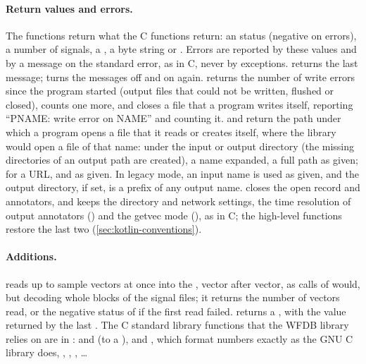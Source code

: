 \paragraph{Return values and errors.} The functions return what the C functions return:
an  status (negative on errors), a number of signals, a , a byte
string or . Errors are reported by these values and by a message on the
standard error, as in C, never by exceptions.  returns the last message;
 turns the messages off and  on again.
 returns the number of write errors since the program
started (output files that could not be written, flushed or closed),
 counts one more, and
 closes a file that a program writes itself,
reporting ``PNAME: write error on NAME'' and counting it.
 and  return the path under
which a program opens a file that it reads or creates itself, where the library would
open a file of that name: under the input or output directory (the missing directories
of an output path are created), a \code{\textasciitilde} name expanded, a full path as
given;  for a URL, and  as given. In legacy mode, an input name is
used as given, and the output directory, if set, is a prefix of any output name.
 closes the open record and annotators, and keeps the directory and
network settings, the time resolution of output annotators () and the
getvec mode (), as in C; the high-level functions restore the last two
(\cref{sec:kotlin-conventions}).

\paragraph{Additions.}  reads up to  sample vectors at once
into the  , vector after vector, as  calls of
 would, but decoding whole blocks of the signal files; it returns the number
of vectors read, or the negative status of  if the first read failed.
 returns a , with the
value returned by the last . The C standard library functions that the WFDB
library relies on are in :  and  (to a
),  and , which format numbers exactly as the
GNU C library does, , , , \ldots

